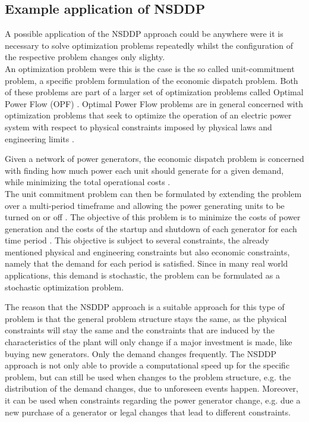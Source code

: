 \subsection{Example application of NSDDP}\label{Example_application_NSDDP}
A possible application of the NSDDP approach could be anywhere were it is necessary to solve optimization problems repeatedly whilst the configuration of the respective problem changes only slighty. \\
An optimization problem were this is the case is the so called unit-commitment problem, a specific problem formulation of the economic dispatch problem.
Both of these problems are part of a larger set of optimization problems called Optimal Power Flow (OPF) \cite{OptimalPowerFlow}.
Optimal Power Flow problems are in general concerned with optimization problems that seek to optimize the operation of an electric power system with respect to physical constraints imposed by physical laws and engineering limits \cite{OptimalPowerFlow}.

Given a network of power generators, the economic dispatch problem is concerned with finding how much power each unit should generate for a given demand, while minimizing the total operational costs \cite{PowerFlowGrossmannBuch}. \\
The unit commitment problem can then be formulated by extending the problem over a multi-period timeframe and allowing the power generating units to be turned on or off \cite{PowerFlowGrossmannBuch}.
The objective of this problem is to minimize the costs of power generation and the costs of the startup and shutdown of each generator for each time period \cite{PowerFlowGrossmannBuch}.
This objective is subject to several constraints, the already mentioned physical and engineering constraints but also economic constraints, namely that the demand for each period is satisfied.
Since in many real world applications, this demand is stochastic, the problem can be formulated as a stochastic optimization problem.

The reason that the NSDDP approach is a suitable approach for this type of problem is that the general problem structure stays the same, as the physical constraints will stay the same and the constraints that are induced by the characteristics of the plant will only change if a major investment is made, like buying new generators.
Only the demand changes frequently.
The NSDDP approach is not only able to provide a computational speed up for the specific problem, but can still be used when changes to the problem structure, e.g. the distribution of the demand changes, due to unforeseen events happen.
Moreover, it can be used when constraints regarding the power generator change, e.g. due a new purchase of a generator or legal changes that lead to different constraints.


